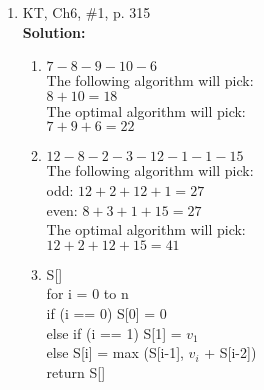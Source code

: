 \documentclass[11pt]{article}
\begin{document}
\begin{enumerate}
\item
KT, Ch6, \#1, p. 315\\
\textbf{Solution:}\\
\begin{enumerate}
\item
$7 - 8 - 9 - 10 - 6$\\
The following algorithm will pick:\\
$8 + 10 = 18$\\
The optimal algorithm will pick:\\
$7 + 9 + 6 = 22$
\item
$12 - 8 - 2 - 3 - 12 - 1 - 1 - 15$\\
The following algorithm will pick:\\
odd: $12 + 2 + 12 + 1 = 27$\\
even: $8 + 3 + 1 + 15 = 27$\\
The optimal algorithm will pick:\\
$12 + 2 + 12 + 15 = 41$
\item
S[]\\
for i = 0 to n\\
\hspace*{1cm} if (i == 0) S[0] = 0\\
\hspace*{1cm} else if (i == 1) S[1] = $v_1$\\
\hspace*{1cm} else S[i] = max (S[i-1], $v_i$ + S[i-2])\\
return S[]


\end{enumerate}
\end{enumerate}
\end{document}
